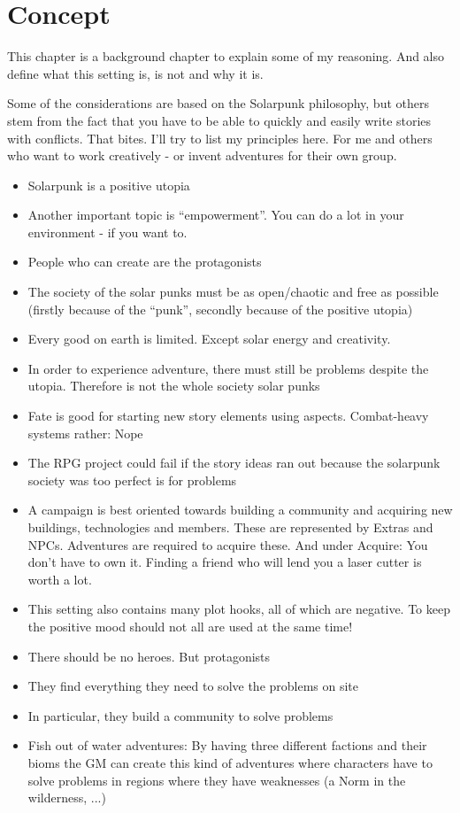 \chapter{Concept}

This chapter is a background chapter to explain some of my reasoning. And also define what this setting is, is not and why it is.

Some of the considerations are based on the Solarpunk philosophy, but others stem from the fact that
you have to be able to quickly and easily write stories with conflicts. That bites. I'll try to list my principles here. For me and others who want to work creatively - or invent adventures for their own group.

\begin{itemize}
\item Solarpunk is a positive utopia
\item Another important topic is “empowerment”. You can do a lot in your environment - if you want to.
\item People who can create are the protagonists
\item The society of the solar punks must be as open/chaotic and free as possible (firstly because of the “punk”, secondly
because of the positive utopia)
\item Every good on earth is limited. Except solar energy and creativity.
\item In order to experience adventure, there must still be problems despite the utopia. Therefore is not the whole society
solar punks
\item Fate is good for starting new story elements using aspects. Combat-heavy systems rather: Nope
\item The RPG project could fail if the story ideas ran out because the solarpunk society was too perfect
is for problems
\item A campaign is best oriented towards building a community and acquiring new buildings, technologies and
members. These are represented by Extras and NPCs. Adventures are required to acquire these. And under
Acquire: You don't have to own it. Finding a friend who will lend you a laser cutter is worth a lot.
\item This setting also contains many plot hooks, all of which are negative. To keep the positive mood should
not all are used at the same time!
\item There should be no heroes. But protagonists
\item They find everything they need to solve the problems on site
\item In particular, they build a community to solve problems
\item Fish out of water adventures: By having three different factions and their bioms the GM can create this kind of adventures where characters have to solve problems in regions where they have weaknesses (a Norm in the wilderness, ...) 
\end{itemize}



